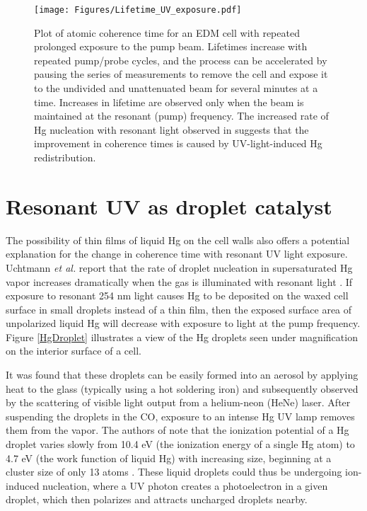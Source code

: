 \documentclass [10pt, twoside] {uwthesis}[2012/04/02]
\begin{document}
\begin{figure}
\begin{center}
\texttt{[image: Figures/Lifetime\_UV\_exposure.pdf]}
\end{center}
\caption[Coherence time of a Hg cell with repeated resonant UV exposure]%
{\narrower Plot of atomic coherence time for an EDM cell with repeated prolonged exposure to the pump beam. Lifetimes increase with repeated pump/probe cycles, and the process can be accelerated by pausing the series of measurements to remove the cell and expose it to the undivided and unattenuated beam for several minutes at a time. Increases in lifetime are observed only when the beam is maintained at the resonant (pump) frequency. The increased rate of Hg nucleation with resonant light observed in \cite{1998_HgPhotonucleation} suggests that the improvement in coherence times is caused by UV-light-induced Hg redistribution.}
\label{LifetimeUV}
\end{figure}

\section{Resonant UV as droplet catalyst} \label{HgNucleation}
The possibility of thin films of liquid Hg on the cell walls also offers a potential explanation for the change in coherence time with resonant UV light exposure. Uchtmann \textit{et al.} report that the rate of droplet nucleation in supersaturated Hg vapor increases dramatically when the gas is illuminated with resonant light \cite{1998_HgPhotonucleation}. If exposure to resonant 254 nm light causes Hg to be deposited on the waxed cell surface in small droplets instead of a thin film, then the exposed surface area of unpolarized liquid Hg will decrease with exposure to light at the pump frequency. Figure \ref{HgDroplet} illustrates a view of the Hg droplets seen under magnification on the interior surface of a cell. 

It was found that these droplets can be easily formed into an aerosol by applying heat to the glass (typically using a hot soldering iron) and subsequently observed by the scattering of visible light output from a helium-neon (HeNe) laser. After suspending the droplets in the CO, exposure to an intense Hg UV lamp removes them from the vapor. The authors of \cite{1998_HgPhotonucleation} note that the ionization potential of a Hg droplet varies slowly from 10.4 eV (the ionization energy of a single Hg atom) to 4.7 eV (the work function of liquid Hg) with increasing size, beginning at a cluster size of only 13 atoms \cite{1991_Hg_Ionization_Potential}. These liquid droplets could thus be undergoing ion-induced nucleation, where a UV photon creates a photoelectron in a given droplet, which then polarizes and attracts uncharged droplets nearby. 
\end{document}

